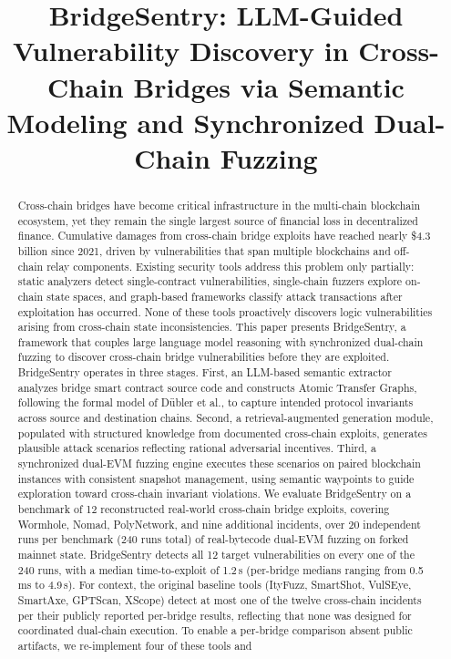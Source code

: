 \documentclass[journal]{IEEEtran}
\begin{document}
\title{BridgeSentry: LLM-Guided Vulnerability Discovery in Cross-Chain Bridges via Semantic Modeling and Synchronized Dual-Chain Fuzzing}


\maketitle

\begin{abstract}
Cross-chain bridges have become critical infrastructure in the multi-chain blockchain ecosystem, yet they remain the single largest source of financial loss in decentralized finance. Cumulative damages from cross-chain bridge exploits have reached nearly \$4.3 billion since 2021, driven by vulnerabilities that span multiple blockchains and off-chain relay components. Existing security tools address this problem only partially: static analyzers detect single-contract vulnerabilities, single-chain fuzzers explore on-chain state spaces, and graph-based frameworks classify attack transactions after exploitation has occurred. None of these tools proactively discovers logic vulnerabilities arising from cross-chain state inconsistencies. This paper presents BridgeSentry, a framework that couples large language model reasoning with synchronized dual-chain fuzzing to discover cross-chain bridge vulnerabilities before they are exploited. BridgeSentry operates in three stages. First, an LLM-based semantic extractor analyzes bridge smart contract source code and constructs Atomic Transfer Graphs, following the formal model of D\"ubler et al., to capture intended protocol invariants across source and destination chains. Second, a retrieval-augmented generation module, populated with structured knowledge from documented cross-chain exploits, generates plausible attack scenarios reflecting rational adversarial incentives. Third, a synchronized dual-EVM fuzzing engine executes these scenarios on paired blockchain instances with consistent snapshot management, using semantic waypoints to guide exploration toward cross-chain invariant violations. We evaluate BridgeSentry on a benchmark of 12 reconstructed real-world cross-chain bridge exploits, covering Wormhole, Nomad, PolyNetwork, and nine additional incidents, over 20 independent runs per benchmark (240 runs total) of real-bytecode dual-EVM fuzzing on forked mainnet state. BridgeSentry detects all 12 target vulnerabilities on every one of the 240 runs, with a median time-to-exploit of 1.2\,s (per-bridge medians ranging from 0.5\,ms to 4.9\,s). For context, the original baseline tools (ItyFuzz, SmartShot, VulSEye, SmartAxe, GPTScan, XScope) detect at most one of the twelve cross-chain incidents per their publicly reported per-bridge results, reflecting that none was designed for coordinated dual-chain execution. To enable a per-bridge comparison absent public artifacts, we re-implement four of these tools and 
\end{abstract}
\end{document}

